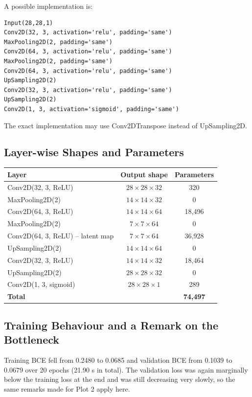 \documentclass[10pt]{article}
\begin{document}
A possible implementation is:

\begin{verbatim}
Input(28,28,1)
Conv2D(32, 3, activation='relu', padding='same')
MaxPooling2D(2, padding='same')
Conv2D(64, 3, activation='relu', padding='same')
MaxPooling2D(2, padding='same')
Conv2D(64, 3, activation='relu', padding='same')
UpSampling2D(2)
Conv2D(32, 3, activation='relu', padding='same')
UpSampling2D(2)
Conv2D(1, 3, activation='sigmoid', padding='same')
\end{verbatim}

The exact implementation may use Conv2DTranspose instead of UpSampling2D.

\subsection*{Layer-wise Shapes and Parameters}

\begin{center}
\begin{tabular}{|l|c|c|}
\hline
Layer & Output shape & Parameters\\
\hline
Conv2D(32, 3, ReLU) & $28\times28\times32$ & 320\\
MaxPooling2D(2) & $14\times14\times32$ & 0\\
Conv2D(64, 3, ReLU) & $14\times14\times64$ & 18,496\\
MaxPooling2D(2) & $7\times7\times64$ & 0\\
Conv2D(64, 3, ReLU) -- latent map & $7\times7\times64$ & 36,928\\
UpSampling2D(2) & $14\times14\times64$ & 0\\
Conv2D(32, 3, ReLU) & $14\times14\times32$ & 18,464\\
UpSampling2D(2) & $28\times28\times32$ & 0\\
Conv2D(1, 3, sigmoid) & $28\times28\times1$ & 289\\
\hline
\textbf{Total} & & \textbf{74,497}\\
\hline
\end{tabular}
\end{center}

\subsection*{Training Behaviour and a Remark on the Bottleneck}

Training BCE fell from 0.2480 to 0.0685 and validation BCE from 0.1039 to
0.0679 over 20 epochs (21.90 s in total). The validation loss was again
marginally below the training loss at the end and was still decreasing very
slowly, so the same remarks made for Plot 2 apply here.
\end{document}
